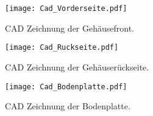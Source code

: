 \begin{figure}[h]
	\centering
		\texttt{[image: Cad\_Vorderseite.pdf]}
	\caption{CAD Zeichnung der Gehäusefront.}
	\label{fig:Cad_Vorderseite}
\end{figure}

\begin{figure}[h]
	\centering
		\texttt{[image: Cad\_Ruckseite.pdf]}
	\caption{CAD Zeichnung der Gehäuserückseite.}
	\label{fig:Cad_Ruckseite}
\end{figure}

\begin{figure}[h]
	\centering
		\texttt{[image: Cad\_Bodenplatte.pdf]}
	\caption{CAD Zeichnung der Bodenplatte.}
	\label{fig:Cad_Bodenplatte}
\end{figure}

